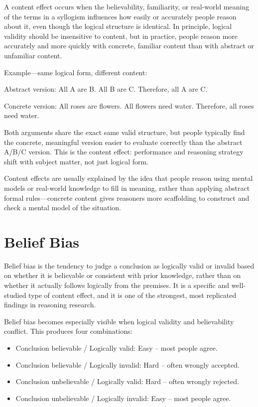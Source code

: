 \documentclass[11pt]{article}
\begin{document}
A content effect occurs when the believability, familiarity, or real-world meaning of the terms in a syllogism influences how easily or accurately people reason about it, even though the logical structure is identical. In principle, logical validity should be insensitive to content, but in practice, people reason more accurately and more quickly with concrete, familiar content than with abstract or unfamiliar content.

Example---same logical form, different content:

Abstract version:
All A are B. All B are C. Therefore, all A are C.

Concrete version:
All roses are flowers. All flowers need water. Therefore, all roses need water.

Both arguments share the exact same valid structure, but people typically find the concrete, meaningful version easier to evaluate correctly than the abstract A/B/C version. This is the content effect: performance and reasoning strategy shift with subject matter, not just logical form.

Content effects are usually explained by the idea that people reason using mental models or real-world knowledge to fill in meaning, rather than applying abstract formal rules---concrete content gives reasoners more scaffolding to construct and check a mental model of the situation.

\section{Belief Bias}

Belief bias is the tendency to judge a conclusion as logically valid or invalid based on whether it is believable or consistent with prior knowledge, rather than on whether it actually follows logically from the premises. It is a specific and well-studied type of content effect, and it is one of the strongest, most replicated findings in reasoning research.

Belief bias becomes especially visible when logical validity and believability conflict. This produces four combinations:

\begin{itemize}
	\item Conclusion believable / Logically valid: Easy -- most people agree.
	\item Conclusion believable / Logically invalid: Hard -- often wrongly accepted.
	\item Conclusion unbelievable / Logically valid: Hard -- often wrongly rejected.
	\item Conclusion unbelievable / Logically invalid: Easy -- most people agree.
\end{itemize}
\end{document}
